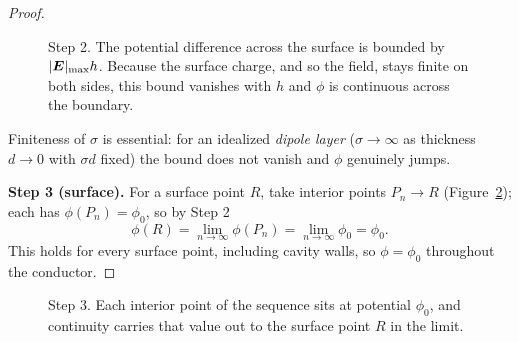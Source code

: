 \begin{proof}
\begin{figure}[H]
\begin{center}
\end{center}
\caption{Step 2. The potential difference across the surface is bounded by $|\vect{E}|_{\max}h$. Because the surface charge, and so the field, stays finite on both sides, this bound vanishes with $h$ and $\phi$ is continuous across the boundary.}
\label{fig:em-equip-continuity}
\end{figure}

Finiteness of $\sigma$ is essential: for an idealized \emph{dipole layer} ($\sigma\to\infty$ as thickness $d\to 0$ with $\sigma d$ fixed) the bound does not vanish and $\phi$ genuinely jumps.

\textbf{Step 3 (surface).} For a surface point $R$, take interior points $P_n\to R$ (Figure~\ref{fig:em-equip-surface}); each has $\phi(P_n)=\phi_0$, so by Step 2
\[
    \phi(R) = \lim_{n\to\infty}\phi(P_n) = \lim_{n\to\infty}\phi_0 = \phi_0 .
\]
This holds for every surface point, including cavity walls, so $\phi=\phi_0$ throughout the conductor.
\end{proof}

\begin{figure}[H]
\begin{center}
\end{center}
\caption{Step 3. Each interior point of the sequence sits at potential $\phi_0$, and continuity carries that value out to the surface point $R$ in the limit.}
\label{fig:em-equip-surface}
\end{figure}

